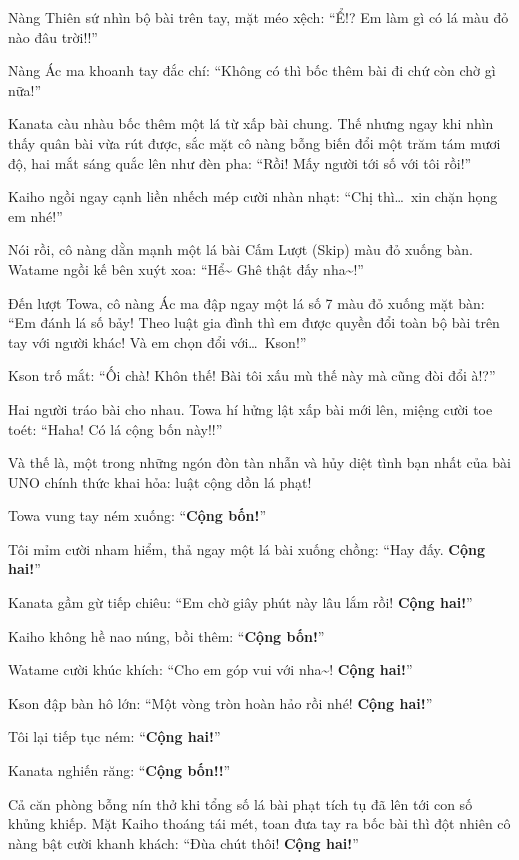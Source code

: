 \documentclass[../main.tex]{subfiles}
\begin{document}
Nàng Thiên sứ nhìn bộ bài trên tay, mặt méo xệch: ``Ể!? Em làm gì có lá màu đỏ nào đâu trời!!''

Nàng Ác ma khoanh tay đắc chí: ``Không có thì bốc thêm bài đi chứ còn chờ gì nữa!''

Kanata càu nhàu bốc thêm một lá từ xấp bài chung. Thế nhưng ngay khi nhìn thấy quân bài vừa rút được, sắc mặt cô nàng bỗng biến đổi một trăm tám mươi độ, hai mắt sáng quắc lên như đèn pha: ``Rồi! Mấy người tới số với tôi rồi!''

Kaiho ngồi ngay cạnh liền nhếch mép cười nhàn nhạt: ``Chị thì\dots\ xin chặn họng em nhé!''

Nói rồi, cô nàng dằn mạnh một lá bài Cấm Lượt (Skip) màu đỏ xuống bàn. Watame ngồi kế bên xuýt xoa: ``Hể\~{} Ghê thật đấy nha\~{}!''

Đến lượt Towa, cô nàng Ác ma đập ngay một lá số 7 màu đỏ xuống mặt bàn: ``Em đánh lá số bảy! Theo luật gia đình thì em được quyền đổi toàn bộ bài trên tay với người khác! Và em chọn đổi với\dots\ Kson!''

Kson trố mắt: ``Ối chà! Khôn thế! Bài tôi xấu mù thế này mà cũng đòi đổi à!?''

Hai người tráo bài cho nhau. Towa hí hửng lật xấp bài mới lên, miệng cười toe toét: ``Haha! Có lá cộng bốn này!!''

Và thế là, một trong những ngón đòn tàn nhẫn và hủy diệt tình bạn nhất của bài UNO chính thức khai hỏa: luật cộng dồn lá phạt!

Towa vung tay ném xuống: ``\textbf{Cộng bốn!}''

Tôi mỉm cười nham hiểm, thả ngay một lá bài xuống chồng: ``Hay đấy. \textbf{Cộng hai!}''

Kanata gầm gừ tiếp chiêu: ``Em chờ giây phút này lâu lắm rồi! \textbf{Cộng hai!}''

Kaiho không hề nao núng, bồi thêm: ``\textbf{Cộng bốn!}''

Watame cười khúc khích: ``Cho em góp vui với nha\~{}! \textbf{Cộng hai!}''

Kson đập bàn hô lớn: ``Một vòng tròn hoàn hảo rồi nhé! \textbf{Cộng hai!}''

Tôi lại tiếp tục ném: ``\textbf{Cộng hai!}''

Kanata nghiến răng: ``\textbf{Cộng bốn!!}''

Cả căn phòng bỗng nín thở khi tổng số lá bài phạt tích tụ đã lên tới con số khủng khiếp. Mặt Kaiho thoáng tái mét, toan đưa tay ra bốc bài thì đột nhiên cô nàng bật cười khanh khách: ``Đùa chút thôi! \textbf{Cộng hai!}''
\end{document}
